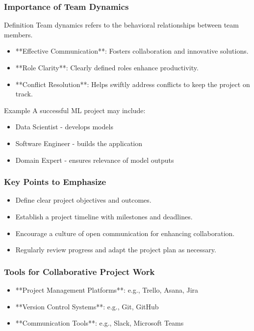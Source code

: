 \documentclass[aspectratio=169]{beamer}
\begin{document}
\begin{frame}[fragile]
    \frametitle{Importance of Team Dynamics}
    
    \begin{block}{Definition}
        Team dynamics refers to the behavioral relationships between team members.
    \end{block}
    
    \begin{itemize}
        \item **Effective Communication**: Fosters collaboration and innovative solutions.
        \item **Role Clarity**: Clearly defined roles enhance productivity.
        \item **Conflict Resolution**: Helps swiftly address conflicts to keep the project on track.
    \end{itemize}
    
    \begin{block}{Example}
        A successful ML project may include:
        \begin{itemize}
            \item Data Scientist - develops models
            \item Software Engineer - builds the application
            \item Domain Expert - ensures relevance of model outputs
        \end{itemize}
    \end{block}
\end{frame}

\begin{frame}[fragile]
    \frametitle{Key Points to Emphasize}
    
    \begin{itemize}
        \item Define clear project objectives and outcomes.
        \item Establish a project timeline with milestones and deadlines.
        \item Encourage a culture of open communication for enhancing collaboration.
        \item Regularly review progress and adapt the project plan as necessary.
    \end{itemize}
\end{frame}

\begin{frame}[fragile]
    \frametitle{Tools for Collaborative Project Work}
    
    \begin{itemize}
        \item **Project Management Platforms**: e.g., Trello, Asana, Jira
        \item **Version Control Systems**: e.g., Git, GitHub
        \item **Communication Tools**: e.g., Slack, Microsoft Teams
    \end{itemize}
\end{frame}
\end{document}
